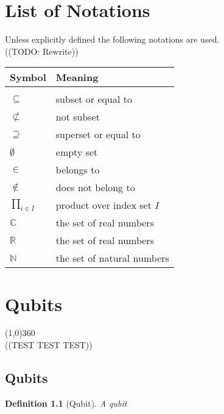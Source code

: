 \documentclass[12pt,twoside]{report}
\newtheorem{defn}[subsection]{Definition}
\begin{document}
\chapter*{List of Notations}
Unless explicitly defined the following notations are used.\\
((TODO: Rewrite))
\begin{tabular}{p{2cm}p{5cm}}
	\textbf{Symbol} & \textbf{Meaning}\\
	\hline
	& \\
	$\subseteq$ & subset or equal to \\%
	$\not\subset$ & not subset\\%
	$\supseteq$ & superset or equal to \\
	$\emptyset$ & empty set\\%
	$\in$ & belongs to\\%
	$\not \in $ & does not belong to \\
	$\displaystyle\prod_{i \in I}$ & product over index set $I$ \\
	$\mathbb{C}$ & the set of real numbers\\%
	$\mathbb{R}$ & the set of real numbers\\%
	$\mathbb{N}$ & the set of natural numbers\\%
\end{tabular}

\tableofcontents
\newpage
{}

\chapter{Qubits}
\line(1,0){360} \\
((TEST TEST TEST))
\section{Qubits}
\begin{defn}[Qubit]
    A qubit
\end{defn}
\end{document}
